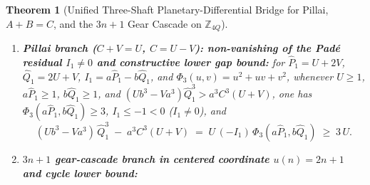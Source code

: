 \documentclass[11pt,a4paper]{article}
\theoremstyle{plain}
\newtheorem{theorem}{Theorem}[section]
\theoremstyle{definition}
\begin{document}
\begin{theorem}[Unified Three-Shaft Planetary-Differential Bridge for Pillai, $A+B=C$, and the $3n+1$ Gear Cascade on $\mathbb{Z}_{4Q}$]
\begin{enumerate}[label=\textbf{(\roman*)},leftmargin=*]
  on the fundamental circle domain $0 \le \alpha \le \widetilde{A}X - 1$ ($\widetilde{B}^2\widetilde{C}Y^2 Z > 0$), the identity $(\widetilde{B}Y)C + (\widetilde{B}^2\widetilde{C})(Y^2 Z)\alpha = R_{\mathrm{full}}\beta$ traps $(\widetilde{B}Y)C$ in the bilateral integer bracket
  \[
    R_{\mathrm{full}}\,\beta \;-\; (\widetilde{B}^2\widetilde{C})(Y^2 Z)(\widetilde{A}X - 1) \;\le\; (\widetilde{B}Y)\,C \;\le\; R_{\mathrm{full}}\,\beta
  \]
  (with strict upper bound $(\widetilde{B}Y)C < R_{\mathrm{full}}\beta$ whenever $\alpha \ge 1$).
\item \textbf{Pillai branch ($C + V = U$, $C = U - V$): non-vanishing of the Pad\'e residual $I_1 \ne 0$ and constructive lower gap bound:}
  for $\widehat{P}_1 = U+2V$, $\widehat{Q}_1 = 2U+V$, $I_1 = a\widehat{P}_1 - b\widehat{Q}_1$, and $\Phi_3(u,v) = u^2+uv+v^2$, whenever $U\ge 1$, $a\widehat{P}_1\ge 1$, $b\widehat{Q}_1\ge 1$, and $(U b^3 - V a^3)\widehat{Q}_1^3 > a^3 C^3(U+V)$, one has $\Phi_3(a\widehat{P}_1,b\widehat{Q}_1)\ge 3$, $I_1 \le -1 < 0$ ($I_1\ne 0$), and
  \[
    (U b^3 - V a^3)\,\widehat{Q}_1^3 \;-\; a^3 C^3(U + V) \;=\; U\,(-I_1)\,\Phi_3(a\widehat{P}_1, b\widehat{Q}_1) \;\ge\; 3\,U.
  \]
\item \textbf{$3n+1$ gear-cascade branch in centered coordinate $u(n) = 2n+1$ and cycle lower bound:}

\end{enumerate}
\end{theorem}
\end{document}
